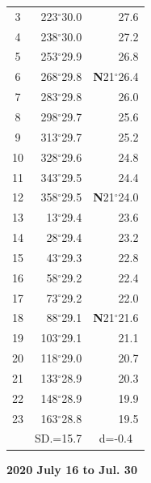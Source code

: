 \documentclass[10pt, a4paper]{report}
\begin{document}
\begin{scriptsize}
\begin{tabular*}{0.2\textwidth}[t]{@{\extracolsep{\fill}}|c|rr|}
3 & 223$^\circ$30.0 & \raisebox{0.24ex}{\boldmath$\cdot$~\boldmath$\cdot$~~}27.6\\
4 & 238$^\circ$30.0 & 27.2\\
5 & 253$^\circ$29.9 & 26.8\\[2Pt]
6 & 268$^\circ$29.8 & \textbf{N}21$^\circ$26.4\\
7 & 283$^\circ$29.8 & 26.0\\
8 & 298$^\circ$29.7 & 25.6\\
9 & 313$^\circ$29.7 & \raisebox{0.24ex}{\boldmath$\cdot$~\boldmath$\cdot$~~}25.2\\
10 & 328$^\circ$29.6 & 24.8\\
11 & 343$^\circ$29.5 & 24.4\\[2Pt]
12 & 358$^\circ$29.5 & \textbf{N}21$^\circ$24.0\\
13 & 13$^\circ$29.4 & 23.6\\
14 & 28$^\circ$29.4 & 23.2\\
15 & 43$^\circ$29.3 & \raisebox{0.24ex}{\boldmath$\cdot$~\boldmath$\cdot$~~}22.8\\
16 & 58$^\circ$29.2 & 22.4\\
17 & 73$^\circ$29.2 & 22.0\\[2Pt]
18 & 88$^\circ$29.1 & \textbf{N}21$^\circ$21.6\\
19 & 103$^\circ$29.1 & 21.1\\
20 & 118$^\circ$29.0 & 20.7\\
21 & 133$^\circ$28.9 & \raisebox{0.24ex}{\boldmath$\cdot$~\boldmath$\cdot$~~}20.3\\
22 & 148$^\circ$28.9 & 19.9\\
23 & 163$^\circ$28.8 & 19.5\\
\hline
\rule{0pt}{2.4ex} & \multicolumn{1}{c}{SD.=15.7} & \multicolumn{1}{c|}{d=-0.4}\\
\hline
\end{tabular*}

\end{scriptsize}
\newpage
\sffamily
\noindent
\begin{flushright}
\textbf{2020 July 16 to Jul. 30}\par
\end{flushright}
\end{document}
